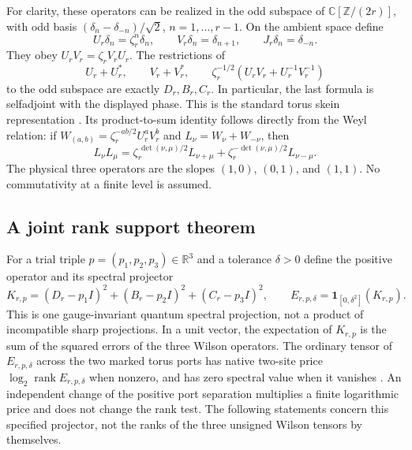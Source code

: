 For clarity, these operators can be realized in the odd subspace of
\(\mathbb C[\mathbb Z/(2r)]\), with odd basis
\((\delta_n-\delta_{-n})/\sqrt2\),
\(n=1,\ldots,r-1\).  On the ambient space define
\[
 U_r\delta_n=\zeta_r^n\delta_n,\qquad
 V_r\delta_n=\delta_{n+1},\qquad J_r\delta_n=\delta_{-n}.
\]
They obey \(U_r V_r=\zeta_r V_r U_r\).  The restrictions of
\[
 U_r+U_r^*,\qquad V_r+V_r^*,\qquad
 \zeta_r^{-1/2}(U_r V_r+U_r^{-1}V_r^{-1})
\]
to the odd subspace are exactly \(D_r,B_r,C_r\).
In particular, the last formula is selfadjoint with the displayed
phase.  This is the standard torus skein representation
\cite{FrohmanGelca,CharlesMarche}.  Its product-to-sum identity follows
directly from the Weyl relation: if \(W_{(a,b)}=\zeta_r^{-ab/2}U_r^aV_r^b\)
and \(L_{\nu}=W_\nu+W_{-\nu}\), then
\begin{equation}
 L_\nu L_\mu
   =\zeta_r^{\,\det(\nu,\mu)/2}L_{\nu+\mu}
     +\zeta_r^{-\det(\nu,\mu)/2}L_{\nu-\mu}.
 \label{eq:tw-torus-product-sum}
\end{equation}
The physical three operators are the slopes \((1,0)\), \((0,1)\), and
\((1,1)\).  No commutativity at a finite level is assumed.

\subsection{A joint rank support theorem}

For a trial triple \(p=(p_1,p_2,p_3)\in\mathbb R^3\) and
a tolerance \(\delta>0\) define the positive operator and its spectral
projector
\begin{equation}
 K_{r,p}=(D_r-p_1I)^2+(B_r-p_2I)^2+(C_r-p_3I)^2,\qquad
 E_{r,p,\delta}=\boldsymbol{1}_{[0,\delta^2]}(K_{r,p}).
 \label{eq:tw-torus-joint-penalty}
\end{equation}
This is one gauge-invariant quantum spectral projection, not a product
of incompatible sharp projections.  In a unit vector, the expectation
of \(K_{r,p}\) is the sum of the squared errors of the three Wilson
operators.  The ordinary tensor of \(E_{r,p,\delta}\) across the two
marked torus ports has native two-site price \(\log_2 \operatorname{rank} E_{r,p,\delta}\)
when nonzero, and has zero spectral value when it vanishes
\cite{OpenAIPrice}.  An independent change of the positive port
separation multiplies a finite logarithmic price and does not change the
rank test.  The following statements concern this specified projector,
not the ranks of the three unsigned Wilson tensors by themselves.

